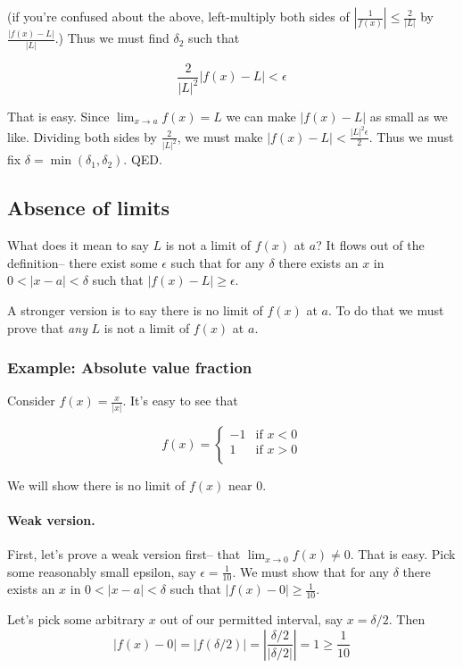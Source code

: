 (if you're confused about the above, left-multiply both sides of
$|\frac{1}{f(x)}|\leq \frac{2}{|L|}$ by $\frac{|f(x)-L|}{|L|}$.) Thus we
must find $\delta_2$ such that

\[\frac{2}{|L|^2}|f(x)-L|<\epsilon\]

That is easy. Since $\lim_{x\to a}f(x)=L$ we can make $|f(x)-L|$ as
small as we like. Dividing both sides by $\frac{2}{|L|^2}$, we must
make $|f(x)-L|<\frac{|L|^2\epsilon}{2}$. Thus we must fix
$\delta=\min(\delta_1, \delta_2)$. QED.

\subsection{Absence of limits}

What does it mean to say $L$ is not a limit of $f(x)$ at $a$? It flows
out of the definition-- there exist some $\epsilon$ such that for any
$\delta$ there exists an $x$ in $0<|x-a|<\delta$ such that $|f(x)-L|\geq\epsilon$.

\vs

A stronger version is to say there is no limit of $f(x)$ at $a$. To do
that we must prove that \textit{any} $L$ is not a limit of $f(x)$ at
$a$.

\subsubsection*{Example: Absolute value fraction}

Consider $f(x)=\frac{x}{|x|}$. It's easy to see that

\[f(x)=\begin{cases}
    -1 & \text{if } x<0\\
    1 & \text{if } x>0\\
\end{cases}\]

We will show there is no limit of $f(x)$ near $0$.

\paragraph{Weak version.}

First, let's prove a weak version first-- that
$\lim_{x\to 0}f(x)\neq 0$. That is easy. Pick some reasonably small
epsilon, say $\epsilon=\frac{1}{10}$. We must show that for any
$\delta$ there exists an $x$ in $0<|x-a|<\delta$ such that
$|f(x)-0|\geq \frac{1}{10}$.

\vs

Let's pick some arbitrary $x$ out of our permitted interval, say $x=\delta/2$. Then
\[|f(x)-0|=|f(\delta/2)|=\left|\frac{\delta/2}{|\delta/2|}\right|=1\geq\frac{1}{10}\]


